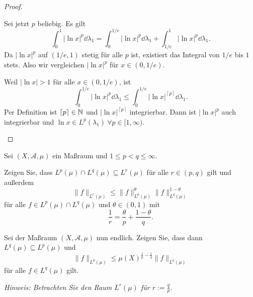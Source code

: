 \begin{proof}
\begin{parts}
	Sei jetzt $p$ beliebig. Es gilt
	\[
		\int_0^1 |\ln x|^p\dd{\lambda_1}=\int_0^{1 / e}|\ln x|^p\dd{\lambda_1}+\int_{1 / e}^1 |\ln x|^p\dd{\lambda_1}
	.\] 
	Da $|\ln x|^p$ auf $(1 / e, 1)$ stetig f\"{u}r alle $p$ ist, existiert das Integral von $1 / e$ bis $1$ stets. Also wir vergleichen $|\ln x|^p$ f\"{u}r $x\in (0,1 / e)$. 

	Weil $|\ln x|>1$ f\"{u}r alle $x\in (0, 1 / e)$, ist
	\[
		\int_0^{1 / e}|\ln x|^p\dd{\lambda_1}\le \int_0^{1 / e}|\ln x|^{\left\lceil  p \right\rceil}\dd{\lambda_1} 
	.\] 
	Per Definition ist $\left\lceil p \right\rceil \in \mathbb{N}$ und $|\ln x|^{\left\lceil p \right\rceil }$ integrierbar. Dann ist $|\ln x|^p$ auch integrierbar und $\ln x\in L^p(\lambda_1)~\forall p\in [1,\infty)$.\qedhere
	\end{parts}
\end{proof}
\begin{Problem}
	Sei $(X, \mathcal{A},\mu)$ ein Maßraum und $1\le p<q\le\infty$.
	\begin{parts}
	\item Zeigen Sie, dass $L^p(\mu)\cap L^q(\mu)\subseteq L^r(\mu)$ f\"{u}r alle $r\in (p,q)$ gilt und außerdem
		\[
			\|f\|_{L^r(\mu)}\le \|f\|_{L^p(\mu)}^\theta \|f\|_{L^q(\mu)}^{1-\theta}
		\] 
		f\"{u}r alle $f\in L^p(\mu)\cap L^q(\mu)$ und $\theta\in (0,1)$ mit
		\[
		\frac{1}{r}=\frac{\theta}{p}+\frac{1-\theta}{q}
		.\] 
	\item Sei der Maßraum $(X,\mathcal{A},\mu)$ nun endlich. Zeigen Sie, dass dann $L^q(\mu)\subseteq L^p(\mu)$ und
		\[
			\|f\|_{L^p(\mu)}\le \mu(X)^{\frac{1}{p}-\frac{1}{q}}\|f\|_{L^q(\mu)}
		\] 
		f\"{u}r alle $f\in L^q(\mu)$ gilt.

		\emph{Hinweis: Betrachten Sie den Raum $L^r(\mu)$ f\"{u}r $r:=\frac{q}{p}$.}
	\end{parts}
\end{Problem}
